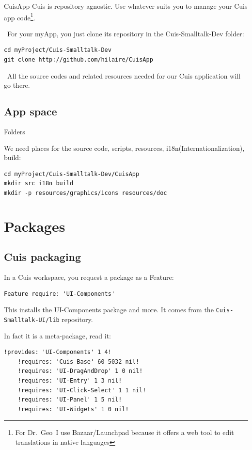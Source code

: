 \documentclass{beamer}
\newcommand{\tip}{\boldmath{\textcolor{red}{$\Rightarrow$}}}
\newcommand{\drgeo}{Dr.~Geo}
\begin{document}
\begin{frame}[fragile]{CuisApp}
  Cuis is repository agnostic. Use whatever suits you to manage your
  Cuis app code\footnote[frame]{ For \drgeo\ I use Bazaar/Launchpad
    because it offers a web tool to edit translations in native
    languages\cite{drgeoRepo}}.

  \tip\ For your \alert{myApp}, you just clone its repository in the
  Cuis-Smalltalk-Dev folder:

\begin{verbatim}
cd myProject/Cuis-Smalltalk-Dev
git clone http://github.com/hilaire/CuisApp
\end{verbatim}

  \tip\ All the source codes and related resources needed for our Cuis
  application will go there.
  
\end{frame}

\subsection{App space}
%
\begin{frame}[fragile]{Folders}

  We need places for the source code, scripts, resources,
  i18n(Internationalization), build:
\begin{verbatim}
cd myProject/Cuis-Smalltalk-Dev/CuisApp
mkdir src i18n build
mkdir -p resources/graphics/icons resources/doc
\end{verbatim}  
\end{frame}
%
\section{Packages}
\subsection{Cuis packaging}
\begin{frame}[fragile]
  In a Cuis workspace, you request a package as a Feature:
  \begin{lstlisting}[language=Smalltalk]
    Feature require: 'UI-Components'
  \end{lstlisting}
  This installs the UI-Components package and more. It comes from the
  \texttt{Cuis-Smalltalk-UI/lib} repository.

  \vspace*{10pt}
  In fact it is a meta-package, read it:
  \fontsize{10pt}{8pt}\selectfont
  \begin{lstlisting}[language=Smalltalk]
    !provides: 'UI-Components' 1 4!
    !requires: 'Cuis-Base' 60 5032 nil!
    !requires: 'UI-DragAndDrop' 1 0 nil!
    !requires: 'UI-Entry' 1 3 nil!
    !requires: 'UI-Click-Select' 1 1 nil!
    !requires: 'UI-Panel' 1 5 nil!
    !requires: 'UI-Widgets' 1 0 nil!
  \end{lstlisting}
\end{frame}
\end{document}
